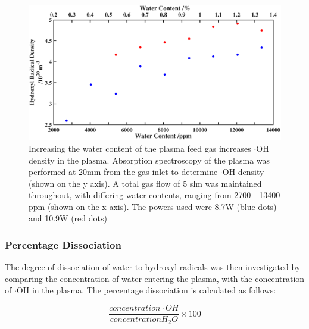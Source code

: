 \documentclass[11pt, oneside]{article}   	%
\begin{document}
\begin{figure}
    \centering
    \includegraphics[width=\textwidth]{Figures/WaterVariationBig}
    \caption{Increasing the water content of the plasma feed gas increases $\cdot$OH density in the plasma. Absorption spectroscopy of the plasma was performed at 20mm from the gas inlet to determine $\cdot$OH density (shown on the y axis). A total gas flow of 5 slm was maintained throughout, with differing water contents, ranging from 2700 - 13400 ppm (shown on the x axis). The powers used were 8.7W (blue dots) and 10.9W (red dots)}
    \label{fig:BubblerVariation}
\end{figure}


\subsubsection{Percentage Dissociation}

The degree of dissociation of water to hydroxyl radicals was then investigated by comparing the concentration of water entering the plasma, with the concentration of $\cdot$OH in the plasma.
The percentage dissociation is calculated as follows:

\begin{equation} \label{eqn:PercentDiss}
	\frac{concentration \cdot OH}{concentration  H_2O} \times 100
\end{equation}
\end{document}
